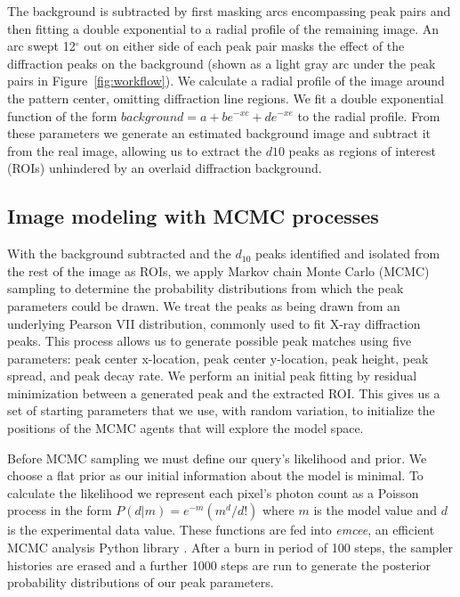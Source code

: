 \documentclass{sig-alternate}
\begin{document}
The background is subtracted by first masking arcs encompassing peak
pairs and then fitting a double exponential to a radial profile of the
remaining image. An arc swept 12$^\circ$ out on either side of each
peak pair masks the effect of the diffraction peaks on the background
(shown as a light gray arc under the peak pairs in
Figure~\ref{fig:workflow}). We calculate a radial profile of the image
around the pattern center, omitting diffraction line regions. We fit a
double exponential function of the form $background = a+ b e^{-x c} +
d e^{-x e}$ to the radial profile. From these parameters we generate
an estimated background image and subtract it from the real image,
allowing us to extract the $d{10}$ peaks as regions of interest (ROIs)
unhindered by an overlaid diffraction background.

\subsection{Image modeling with MCMC processes}

With the background subtracted and the $d_{10}$ peaks identified and
isolated from the rest of the image as ROIs, we apply Markov chain
Monte Carlo (MCMC) sampling to determine the probability distributions
from which the peak parameters could be drawn. We treat the peaks as
being drawn from an underlying Pearson VII distribution, commonly used
to fit X-ray diffraction peaks. This process allows us to generate
possible peak matches using five parameters: peak center x-location,
peak center y-location, peak height, peak spread, and peak decay rate.
We perform an initial peak fitting by residual minimization between a
generated peak and the extracted ROI. This gives us a set of starting
parameters that we use, with random variation, to initialize the
positions of the MCMC agents that will explore the model space. 

Before MCMC sampling we must define our query's likelihood and prior.
We choose a flat prior as our initial information about the model is
minimal. To calculate the likelihood we represent each pixel's photon
count as a Poisson process in the form $P(d|m)=e^{-m}
\left(m^{d}/d!\right)$ where $m$ is the model value and $d$ is the
experimental data value. These functions are fed into \textit{emcee},
an efficient MCMC analysis Python library \cite{ForemanMackey2013}.
After a burn in period of 100 steps, the sampler histories are erased
and a further 1000 steps are run to generate the posterior probability
distributions of our peak parameters. 
\end{document}
